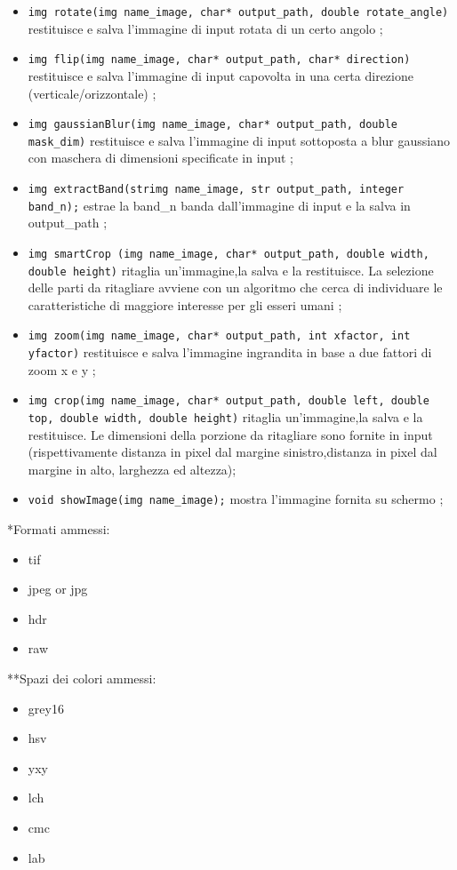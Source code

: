 \documentclass[10pt]{article}
\begin{document}
\begin{itemize}
\item \texttt{img rotate(img name\_image, char* output\_path, double rotate\_angle)} restituisce e salva l’immagine di input rotata di un certo angolo ;
\item \texttt{img flip(img name\_image, char* output\_path, char* direction)} restituisce e salva l’immagine di input capovolta in una certa direzione (verticale/orizzontale) ;
\item \texttt{img gaussianBlur(img name\_image, char* output\_path, double mask\_dim)} restituisce e salva l’immagine di input sottoposta a blur gaussiano con maschera di dimensioni specificate in input ;
\item \texttt{img extractBand(strimg name\_image, str output\_path, integer band\_n);} estrae la band\_n banda dall'immagine di input e la salva in output\_path ;
\item \texttt{img smartCrop (img name\_image, char* output\_path, double width, double height)} ritaglia un’immagine,la salva e la restituisce. La selezione delle parti da ritagliare avviene con un algoritmo che cerca di individuare le caratteristiche di maggiore interesse per gli esseri umani ;
\item \texttt{img zoom(img name\_image, char* output\_path, int xfactor, int yfactor)} restituisce e salva l’immagine ingrandita in base a due fattori di zoom x e y ;
\item \texttt{img crop(img name\_image, char* output\_path, double left, double top, double width, double height)} ritaglia un’immagine,la salva e la restituisce. Le dimensioni della porzione da ritagliare sono fornite in input (rispettivamente distanza in pixel dal margine sinistro,distanza in pixel dal margine in alto, larghezza ed altezza);
\item \texttt{void showImage(img name\_image);} mostra l'immagine fornita su schermo ;
\end{itemize}

*Formati ammessi:
\begin{itemize}
	\item tif
	\item jpeg or jpg
	\item hdr
	\item raw
	\label{itm:formats}
\end{itemize}

**Spazi dei colori ammessi:
\begin{itemize}
	\item grey16
	\item hsv
	\item yxy
	\item lch
	\item cmc
	\item lab
\end{itemize}
\clearpage
\end{document}
